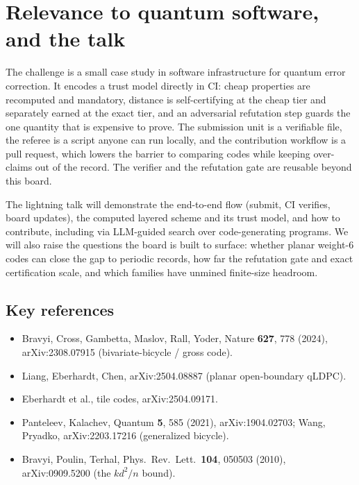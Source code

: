\documentclass[11pt]{article}
\newcommand{\eff}{kd^2/n}
\begin{document}
\section{Relevance to quantum software, and the talk}

The challenge is a small case study in software infrastructure for quantum error
correction. It encodes a trust model directly in CI: cheap properties are
recomputed and mandatory, distance is self-certifying at the cheap tier and
separately earned at the exact tier, and an adversarial refutation step guards
the one quantity that is expensive to prove. The submission unit is a verifiable
file, the referee is a script anyone can run locally, and the contribution
workflow is a pull request, which lowers the barrier to comparing codes while
keeping over-claims out of the record. The verifier and the refutation gate are
reusable beyond this board.

The lightning talk will demonstrate the end-to-end flow (submit, CI verifies,
board updates), the computed layered scheme and its trust model, and how to
contribute, including via LLM-guided search over code-generating programs. We
will also raise the questions the board is built to surface: whether planar
weight-6 codes can close the gap to periodic records, how far the refutation gate
and exact certification scale, and which families have unmined finite-size
headroom.

\subsection*{Key references}
\begin{itemize}[nosep]
  \item Bravyi, Cross, Gambetta, Maslov, Rall, Yoder, Nature \textbf{627}, 778
  (2024), arXiv:2308.07915 (bivariate-bicycle / gross code).
  \item Liang, Eberhardt, Chen, arXiv:2504.08887 (planar open-boundary qLDPC).
  \item Eberhardt et al., tile codes, arXiv:2504.09171.
  \item Panteleev, Kalachev, Quantum \textbf{5}, 585 (2021), arXiv:1904.02703;
  Wang, Pryadko, arXiv:2203.17216 (generalized bicycle).
  \item Bravyi, Poulin, Terhal, Phys.\ Rev.\ Lett.\ \textbf{104}, 050503 (2010),
  arXiv:0909.5200 (the $\eff$ bound).
\end{itemize}
\end{document}
